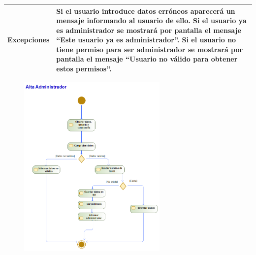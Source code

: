 \begin{table}[H]
\begin{tabularx}{0.8\textwidth}{|p{3.5cm}|X|}
		\hline
		\textbf{Excepciones}      & Si el usuario introduce datos erróneos aparecerá un mensaje informando al usuario de ello. Si el usuario ya es administrador se mostrará por pantalla el mensaje ``Este usuario ya es administrador''. Si el usuario no tiene permiso para ser administrador se mostrará por pantalla el mensaje ``Usuario no válido para obtener estos permisos''. \\
		\hline
	\end{tabularx}
\end{table}
\begin{figure}[H]
	\centering
	\includegraphics[width=0.65\textwidth]{Use_Cases/alta_admin.png}
\end{figure}
\newpage
